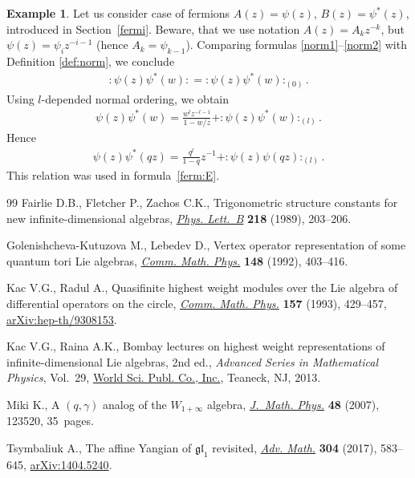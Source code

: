 \documentclass[11pt]{article}
\numberwithin{equation}{section}
\theoremstyle{definition}
\newtheorem{Example}[Theorem]{Example}
\begin{document}
\begin{Example}
Let us consider case of fermions $A(z) = \psi(z)$, $B(z) = \psi^*(z)$, introduced in Section~\ref{fermi}. Beware, that we use notation $A(z)=A_k z^{-k}$, but $\psi(z) = \psi_i z^{-i-1}$ (hence \mbox{$A_k = \psi_{k-1}$}). Comparing formulas \eqref{norm1}--\eqref{norm2} with Definition \ref{def:norm}, we conclude
\begin{gather*}
{: \! \psi(z) \psi^* (w) \! :} = : \psi(z) \psi^*(w):_{(0)}.
\end{gather*}
Using $l$-depended normal ordering, we obtain
\begin{gather} \label{eq: regul prod psipsi}
\psi(z) \psi^* (w) = \frac{w^l z^{-l-1}}{1-w/z} + : \! \psi (z) \psi^* (w) \! :_{(l)}.
\end{gather}
Hence
\begin{gather*}
\psi(z) \psi^* (q z) = \frac{q^l}{1-q} z^{-1} + : \! \psi (z) \psi(qz) \! :_{(l)}.
\end{gather*}
This relation was used in formula~\eqref{ferm:E}.
\end{Example}
\begin{thebibliography}{99}
Fairlie D.B., Fletcher P., Zachos C.K., Trigonometric structure constants for
 new infinite-dimensional algebras, \href{https://doi.org/10.1016/0370-2693(89)91418-4}{\textit{Phys. Lett.~B}} \textbf{218}
 (1989), 203--206.

Golenishcheva-Kutuzova M., Lebedev D., Vertex operator representation of some
 quantum tori {L}ie algebras, \href{https://doi.org/10.1007/BF02100868}{\textit{Comm. Math. Phys.}} \textbf{148} (1992),
 403--416.

Kac V.G., Radul A., Quasifinite highest weight modules over the {L}ie algebra
 of differential operators on the circle, \href{https://doi.org/10.1007/BF02096878}{\textit{Comm. Math. Phys.}}
 \textbf{157} (1993), 429--457, \href{https://arxiv.org/abs/hep-th/9308153}{arXiv:hep-th/9308153}.

Kac V.G., Raina A.K., Bombay lectures on highest weight representations of
 infinite-dimensional {L}ie algebras, 2nd ed., \textit{Advanced Series in Mathematical
 Physics}, Vol.~29, \href{https://doi.org/10.1142/8882}{World Sci. Publ. Co., Inc.}, Teaneck, NJ, 2013.

Miki K., A {$(q,\gamma)$} analog of the {$W_{1+\infty}$} algebra,
 \href{https://doi.org/10.1063/1.2823979}{\textit{J.~Math. Phys.}} \textbf{48} (2007), 123520, 35~pages.

Tsymbaliuk A., The affine {Y}angian of {$\mathfrak{gl}_1$} revisited,
 \href{https://doi.org/10.1016/j.aim.2016.08.041}{\textit{Adv. Math.}} \textbf{304} (2017), 583--645, \href{https://arxiv.org/abs/1404.5240}{arXiv:1404.5240}.

\end{thebibliography}
\end{document}
